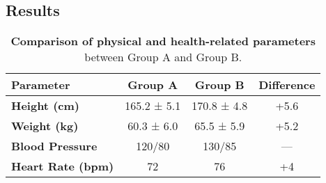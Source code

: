 \begin{adjustwidth}{0.35\textwidth}{0pt}
\section*{Results}
\lipsum[5-6]
\end{adjustwidth}

\vspace{1em}
\begin{table}[H]
\centering
\caption{\textbf{Comparison of physical and health-related parameters} between Group A and Group B.}
\renewcommand{\arraystretch}{1.3}
\setlength{\tabcolsep}{12pt}

\begin{tabular}{>{\bfseries}l c c c}
\toprule
Parameter & Group A & Group B & Difference \\
\midrule
Height (cm)      & 165.2 ± 5.1  & 170.8 ± 4.8  & +5.6 \\
Weight (kg)      & 60.3 ± 6.0   & 65.5 ± 5.9   & +5.2 \\
Blood Pressure   & 120/80       & 130/85       & —    \\
Heart Rate (bpm) & 72           & 76           & +4   \\
\bottomrule
\end{tabular}
\label{tab:results-table}
\end{table}
\vspace{1em}
